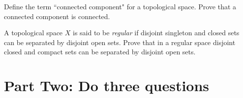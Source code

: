 \documentclass[12pt]{exam}
\theoremstyle{definition}
\newcommand{\R}{\mathcal{R}}
\def\R{{ \Bbb R}}
\begin{document}
\begin{questions}

Define the term ``connected component" for a topological space. Prove that a connected component is connected.



\question

A topological space $X$ is said to be \emph{regular} if disjoint singleton and closed sets can be separated by
disjoint open sets. Prove that in a regular space disjoint closed and compact sets can be separated by disjoint
open sets.

\end{questions}

\section{Part Two: Do three questions}
\end{document}
